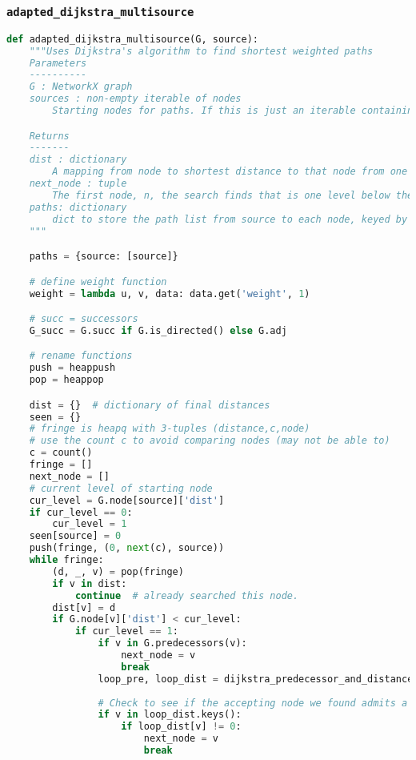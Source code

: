 \subsubsection*{\texttt{adapted\_dijkstra\_multisource}}
\begin{lstlisting}[language=Python]
def adapted_dijkstra_multisource(G, source):
    """Uses Dijkstra's algorithm to find shortest weighted paths
    Parameters
    ----------
    G : NetworkX graph
    sources : non-empty iterable of nodes
        Starting nodes for paths. If this is just an iterable containing a single node, then all paths computed by this function will start from that node. If there are two or more nodes in this iterable, the computed paths may begin from any one of the start nodes.

    Returns
    -------
    dist : dictionary
        A mapping from node to shortest distance to that node from one of the source nodes.
    next_node : tuple
        The first node, n, the search finds that is one level below the current node i.e. d_p(n) = lev - 1
    paths: dictionary
        dict to store the path list from source to each node, keyed by node.
    """

    paths = {source: [source]}

    # define weight function
    weight = lambda u, v, data: data.get('weight', 1)

    # succ = successors
    G_succ = G.succ if G.is_directed() else G.adj

    # rename functions
    push = heappush
    pop = heappop

    dist = {}  # dictionary of final distances
    seen = {}
    # fringe is heapq with 3-tuples (distance,c,node)
    # use the count c to avoid comparing nodes (may not be able to)
    c = count()
    fringe = []
    next_node = []
    # current level of starting node
    cur_level = G.node[source]['dist']
    if cur_level == 0:
        cur_level = 1
    seen[source] = 0
    push(fringe, (0, next(c), source))
    while fringe:
        (d, _, v) = pop(fringe)
        if v in dist:
            continue  # already searched this node.
        dist[v] = d
        if G.node[v]['dist'] < cur_level:
            if cur_level == 1:
                if v in G.predecessors(v):
                    next_node = v
                    break
                loop_pre, loop_dist = dijkstra_predecessor_and_distance(G, v)
                
                # Check to see if the accepting node we found admits a suffix
                if v in loop_dist.keys():
                    if loop_dist[v] != 0:
                        next_node = v
                        break 
            

\end{lstlisting}
